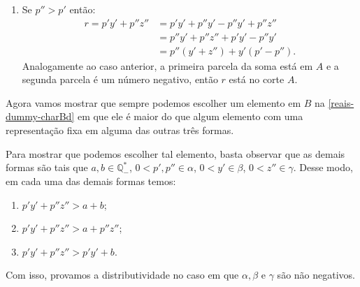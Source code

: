 \documentclass[../main.tex]{subfiles}
\begin{document}
\begin{dem}
\begin{enumerate}
        \item Se $p'' > p'$ então:
            \begin{align*}
                r = p'y' + p''z'' &= p'y' + p''y' - p''y' + p''z'' \\
                &= p''y' + p''z'' + p'y' - p''y' \\
                &= p''(y'+z'') + y'(p'-p'').
            \end{align*}
            Analogamente ao caso anterior, a primeira parcela da soma está em $A$ e a segunda parcela é um número negativo, então $r$ está no corte $A$.
    \end{enumerate}
    Agora vamos mostrar que sempre podemos escolher um elemento em $B$ na \ref{reais-dummy-charBd} em que ele é maior do que algum elemento com uma representação fixa em alguma das outras três formas.
    
    Para mostrar que podemos escolher tal elemento, basta observar que as demais formas são tais que $a, b \in \mathbb{Q}_{-}^*$, $0 < p',p'' \in \alpha$, $0 <  y' \in \beta$, $0 < z'' \in \gamma$. Desse modo, em cada uma das demais formas temos:

      \begin{enumerate}[label=(\roman*)]
        \item $p'y' + p''z'' > a + b $; 
        \item $p'y' + p''z'' > a + p''z''$; 
        \item $p'y' + p''z'' > p'y' + b$.
    \end{enumerate}

    Com isso, provamos a distributividade no caso em que $\alpha, \beta$ e $\gamma$ são não negativos.


\end{dem}
\end{document}
